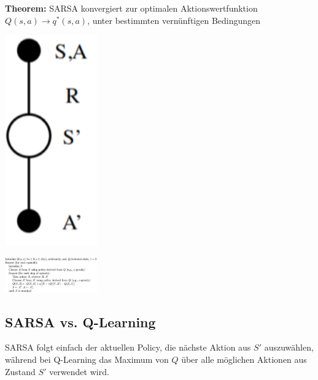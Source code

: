 \documentclass{article}
\newenvironment{Figure}
	{\par\medskip\noindent\minipage{\linewidth}}
	{\endminipage\par\medskip}
\theoremstyle{merke}
\theoremstyle{definition}
\begin{document}
    \textbf{Theorem:} SARSA konvergiert zur optimalen Aktionswertfunktion $Q(s,a) \rightarrow q^*(s,a)$, unter bestimmten vernünftigen Bedingungen
    
    \begin{Figure}
        \centering
        \includegraphics[width=150px]{img/SARSA.png}
            \label{fig:Abbildung des SARSA-Schemas}
    \end{Figure}
    
    \begin{Figure}
        \centering
        \includegraphics[width=150px]{img/SARSAPseudoCode.png}
            \label{fig:Abbildung des SARSA PseudoCodes}
    \end{Figure}
    
        \subsection{SARSA vs. Q-Learning}
        SARSA folgt einfach der aktuellen Policy, die nächste Aktion aus $S'$ auszuwählen, während bei Q-Learning das Maximum von $Q$ über alle möglichen Aktionen aus Zustand $S'$ verwendet wird.
 
\end{document}
